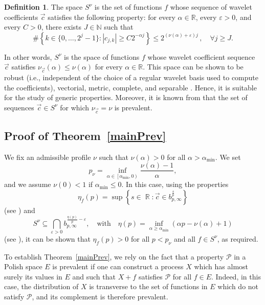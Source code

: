 \documentclass[a4paper,11pt,oneside]{article}
\DeclareMathOperator{\R}{\mathbb{R}}
\newcommand{\coint}[1]{\left[{#1}\right)}
\newcommand{\modu}[1]{\left\vert{#1}\right\vert}
\theoremstyle{definition}
\newtheorem{defi}{Definition}[section]
\theoremstyle{plain}
\begin{document}
\begin{defi}
The space $S^\nu$ is the set of functions $f$ whose sequence of wavelet coefficients $\vec{c}$ satisfies the following property: for every $\alpha \in \mathbb{R}$, every $\varepsilon > 0$, and every $C > 0$, there exists $J \in \mathbb{N}$ such that
\[
\#\left\{k\in\{0,\ldots,2^j-1\}:\modu{c_{j,k}}\geq C2^{-\alpha j}\right\}\leq 2^{(\nu(\alpha)+\varepsilon)j}\, , \quad\forall j\geq J.
\]
\end{defi}

In other words, $S^\nu$ is the space of functions $f$ whose wavelet coefficient sequence $\vec{c}$ satisfies $\nu_{\vec{c}}(\alpha) \leq \nu(\alpha)$ for every $\alpha \in \mathbb{R}$. This space can be shown to be robust (i.e., independent of the choice of a regular wavelet basis used to compute the coefficients), vectorial, metric, complete, and separable \cite{aubryTopological}.
Hence, it is suitable for the study of generic properties. Moreover, it is known from \cite{aubryPrevalence} that the set of sequences $\vec{c} \in S^\nu$ for which $\nu_{\vec{c}} = \nu$ is prevalent.



\subsection{Proof of Theorem~\ref{mainPrev}}\label{secpSnu}



We fix an admissible profile $\nu$ such that $\nu(\alpha) > 0$ for all $\alpha > \alpha_{\min}$.
 We set
\begin{equation}\label{eq:pnu}
p_\nu=\inf_{\alpha\in\coint{\alpha_{\min},0}}\frac{\nu(\alpha)-1}{\alpha},
\end{equation}
and we assume $\nu(0)<1$ if $\alpha_{\min}\leq 0$. 
In this case, using the properties
\[
\eta_f(p)=\sup\left\{s\in\R:\vec{c}\in b_{p,\infty}^{\frac{s}{p}}\right\} 
\]
(see \cite{Jaffard1997}) and
\[
S^\nu\subseteq \bigcap_{\varepsilon>0}b_{p,\infty}^{\frac{\eta(p)}{p}-\varepsilon},\quad\text{with}\quad
\eta(p)=\inf_{\alpha\geq\alpha_{\min}}(\alpha p-\nu(\alpha)+1)
\]
(see \cite{aubryTopological}), it can be shown that $\eta_f(p)>0$ for all $p<p_\nu$ and all $f\in S^\nu$, as required.

\medskip

To establish Theorem~\ref{mainPrev}, we rely on the fact that a property $\mathcal{P}$ in a Polish space $E$ is prevalent if one can construct a process $X$ which has almost surely its values in $E$ and such that $X+f$ satisfies $\mathcal{P}$ for all $f\in E$. Indeed, in this case, the distribution of $X$ is transverse to the set of functions in $E$ which do not satisfy $\mathcal{P}$, and its complement is therefore prevalent.
\end{document}
